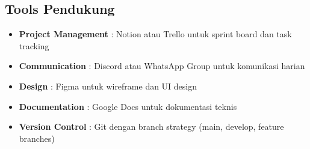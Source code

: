 \subsection{Tools Pendukung}

\begin{itemize}[leftmargin=*]
    \item \textbf{Project Management} : Notion atau Trello untuk sprint board dan task tracking
    \item \textbf{Communication} : Discord atau WhatsApp Group untuk komunikasi harian
    \item \textbf{Design} : Figma untuk wireframe dan UI design
    \item \textbf{Documentation} : Google Docs untuk dokumentasi teknis
    \item \textbf{Version Control} : Git dengan branch strategy (main, develop, feature branches)
\end{itemize}

